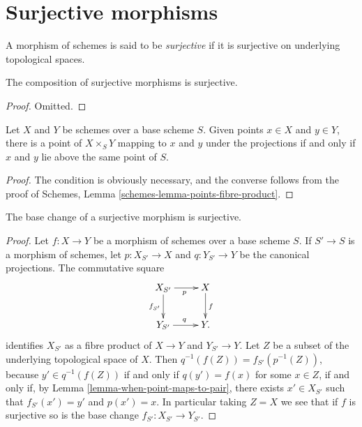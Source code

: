 \section{Surjective morphisms}
\label{section-surjective}

\begin{definition}
\label{definition-surjective}
A morphism of schemes is said to be {\it surjective}
if it is surjective on underlying topological
spaces.
\end{definition}

\begin{lemma}
\label{lemma-composition-surjective}
The composition of surjective morphisms is surjective.
\end{lemma}

\begin{proof}
Omitted.
\end{proof}

\begin{lemma}
\label{lemma-when-point-maps-to-pair}
Let $X$ and $Y$ be schemes over a base scheme $S$. Given points $x \in X$ and
$y \in Y$, there is a point of $X \times_S Y$ mapping to $x$ and $y$ under the
projections if and only if $x$ and $y$ lie above the same point of $S$.
\end{lemma}

\begin{proof}
The condition is obviously necessary, and the converse follows from the proof
of Schemes, Lemma \ref{schemes-lemma-points-fibre-product}.
\end{proof}

\begin{lemma}
\label{lemma-base-change-surjective}
The base change of a surjective morphism is surjective.
\end{lemma}

\begin{proof}
Let $f: X \to Y$ be a morphism of schemes over a base scheme $S$.
If $S' \to S$ is a morphism of schemes, let $p: X_{S'} \to X$
and $q: Y_{S'} \to Y$ be the canonical projections.  The commutative
square
$$
\xymatrix{
X_{S'} \ar[d]_{f_{S'}} \ar[r]_{p} & X \ar[d]^{f} \\
Y_{S'} \ar[r]^{q} & Y.
}
$$
identifies $X_{S'}$ as a fibre product of $X \to Y$ and
$Y_{S'} \to Y$.  Let $Z$ be a subset of the underlying topological
space of $X$.  Then $q^{-1}(f(Z)) = f_{S'}(p^{-1}(Z))$, because
$y' \in q^{-1}(f(Z))$ if and only if $q(y') = f(x)$ for some $x \in Z$,
if and only if, by Lemma \ref{lemma-when-point-maps-to-pair}, there exists
$x' \in X_{S'}$ such that $f_{S'}(x') = y'$ and $p(x') = x$.  In particular
taking $Z = X$ we see that if $f$ is surjective so is the base change
$f_{S'}: X_{S'} \to Y_{S'}$.
\end{proof}

